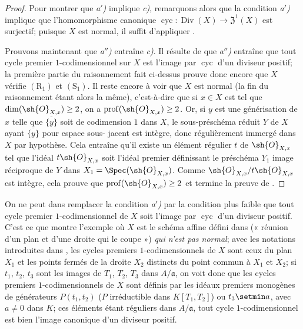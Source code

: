\begin{proof}
Pour montrer que \emph{a$'$)} implique \emph{c)}, remarquons alors que la condition \emph{a$'$)} implique que l'homomorphisme canonique $\operatorname{cyc}:\operatorname{Div}(X)\to\mathfrak{Z}^1(X)$ est surjectif;
puisque $X$ est normal, il suffit d'appliquer .

Prouvons maintenant que \emph{a$''$)} entraîne \emph{c)}.
Il résulte de  que \emph{a$''$)} entraîne que tout cycle premier $1$-codimensionnel sur $X$ est l'image par $\operatorname{cyc}$ d'un diviseur positif;
la première partie du raisonnement fait ci-dessus prouve donc encore que $X$ vérifie $(\mathrm{R}_1)$ et $(\mathrm{S}_1)$.
Il reste encore à voir que $X$ est normal (la fin du raisonnement étant alors la même), c'est-à-dire que si $x\in X$ est tel que $\dim(\sh{O}_{X,x})\geq2$, on a $\operatorname{prof}(\sh{O}_{X,x})\geq2$.
Or, si $y$ est une générisation de $x$ telle que $\overline{\{y\}}$ soit de codimension $1$ dans $X$, le sous-préschéma réduit $Y$ de $X$ ayant $\overline{\{y\}}$ pour espace
sous-%
jacent est intègre, donc régulièrement immergé dans $X$ par hypothèse.
Cela entraîne qu'il existe un élément régulier $t$ de $\sh{O}_{X,x}$ tel que l'idéal $t\sh{O}_{X,x}$ soit l'idéal premier définissant le préschéma $Y_1$ image réciproque de $Y$ dans $X_1=\Spec(\sh{O}_{X,x})$.
Comme $\sh{O}_{X,x}/t\sh{O}_{X,x}$ est intègre, cela prouve que $\operatorname{prof}(\sh{O}_{X,x})\geq2$ et termine la preuve de .
\end{proof}

\begin{remark}[21.7.5]
\label{IV.21.7.5}
On ne peut dans  remplacer la condition \emph{a$'$)} par la condition plus faible que tout cycle premier $1$-codimensionnel de $X$ soit l'image par $\operatorname{cyc}$ d'un diviseur positif.
C'est ce que montre l'exemple où $X$ est le schéma affine défini dans  (« réunion d'un plan et d'une droite qui le coupe ») \emph{qui n'est pas normal};
avec les notations introduites dans , les cycles premiers $1$-codimensionnels de $X$ sont ceux du plan $X_1$ et les points fermés de la droite $X_2$ distincts du point commun à $X_1$ et $X_2$;
si $t_1$, $t_2$, $t_3$ sont les images de $T_1$, $T_2$, $T_3$ dans $A/\mathfrak a$, on voit donc que les cycles premiers $1$-codimensionnels de $X$ sont définis par les idéaux premiers monogènes de générateurs $P(t_1,t_2)$ ($P$ irréductible dans $K[T_1,T_2]$) ou $t_3\setmin a$, avec $a\neq0$ dans $K$;
ces éléments étant réguliers dans $A/\mathfrak a$, tout cycle $1$-codimensionnel est bien l'image canonique d'un diviseur positif.
\end{remark}

